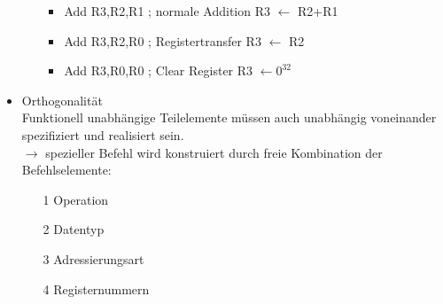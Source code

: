 \begin{itemize}
\begin{itemize}
		\begin{itemize}
			\item Add R3,R2,R1 ; normale Addition R3 $\leftarrow$ R2+R1
			\item Add R3,R2,R0 ; Registertransfer R3 $\leftarrow$ R2
			\item Add R3,R0,R0 ; Clear Register R3 $\leftarrow 0^{32}$
		\end{itemize}
	\end{itemize}
	\item Orthogonalität \\Funktionell unabhängige Teilelemente müssen auch unabhängig voneinander spezifiziert und realisiert sein. \\$\to$ spezieller Befehl wird konstruiert durch freie Kombination der Befehlselemente:
	\begin{itemize}
		\item[1] Operation
		\item[2] Datentyp
		\item[3] Adressierungsart
		\item[4] Registernummern
	\end{itemize}
\end{itemize}
